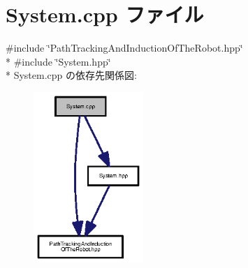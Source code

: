 \section{System.\-cpp ファイル}
\label{_system_8cpp}
{\ttfamily \#include \char`\"{}Path\-Tracking\-And\-Induction\-Of\-The\-Robot.\-hpp\char`\"{}}\\*
{\ttfamily \#include \char`\"{}System.\-hpp\char`\"{}}\\*
System.\-cpp の依存先関係図\-:\nopagebreak
\begin{figure}[H]
\begin{center}
\leavevmode
\includegraphics[width=118pt]{_system_8cpp__incl}
\end{center}
\end{figure}
